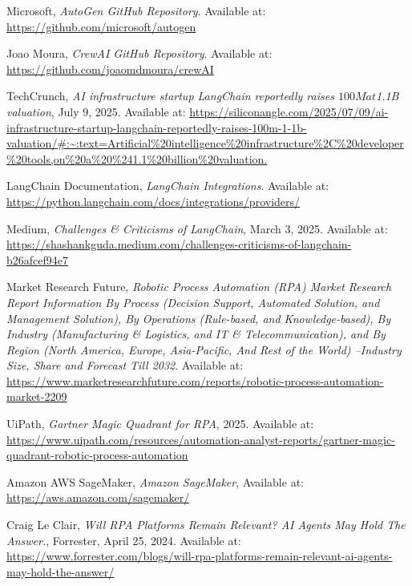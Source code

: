 \documentclass[11pt, a4paper, oneside]{article}
\begin{document}
\begin{thebibliography}{99}
    Microsoft, \textit{AutoGen GitHub Repository}. Available at: \url{https://github.com/microsoft/autogen}

    Joao Moura, \textit{CrewAI GitHub Repository}. Available at: \url{https://github.com/joaomdmoura/crewAI}

    TechCrunch, \textit{AI infrastructure startup LangChain reportedly raises $100M at $1.1B valuation}, July 9, 2025. Available at: \url{https://siliconangle.com/2025/07/09/ai-infrastructure-startup-langchain-reportedly-raises-100m-1-1b-valuation/#:~:text=Artificial%20intelligence%20infrastructure%2C%20developer%20tools,on%20a%20%241.1%20billion%20valuation.}

    LangChain Documentation, \textit{LangChain Integrations}. Available at: \url{https://python.langchain.com/docs/integrations/providers/}

    Medium, \textit{Challenges \& Criticisms of LangChain}, March 3, 2025. Available at: \url{https://shashankguda.medium.com/challenges-criticisms-of-langchain-b26afcef94e7}

    Market Research Future, \textit{Robotic Process Automation (RPA) Market Research Report Information By Process (Decision Support, Automated Solution, and Management Solution), By Operations (Rule-based, and Knowledge-based), By Industry (Manufacturing \& Logistics, and IT \& Telecommunication), and By Region (North America, Europe, Asia-Pacific, And Rest of the World) –Industry Size, Share and Forecast Till 2032}. Available at: \url{https://www.marketresearchfuture.com/reports/robotic-process-automation-market-2209}

    UiPath, \textit{Gartner Magic Quadrant for RPA}, 2025. Available at:
    \url{https://www.uipath.com/resources/automation-analyst-reports/gartner-magic-quadrant-robotic-process-automation}

    Amazon AWS SageMaker, \textit{Amazon SageMaker}, Available at: \url{https://aws.amazon.com/sagemaker/}

    Craig Le Clair, \textit{Will RPA Platforms Remain Relevant? AI Agents May Hold The Answer.}, Forrester, April 25, 2024. Available at: \url{https://www.forrester.com/blogs/will-rpa-platforms-remain-relevant-ai-agents-may-hold-the-answer/}

\end{thebibliography}
\end{document}
